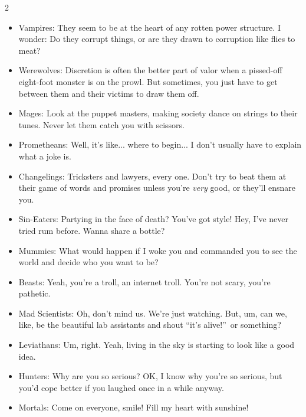 \begin{multicols}{2}
\begin{itemize}
\item Vampires: They seem to be at the heart of any rotten power structure. I wonder: Do they corrupt things, or are they drawn to corruption like flies to meat?
\item Werewolves: Discretion is often the better part of valor when a pissed-off eight-foot monster is on the prowl. But sometimes, you just have to get between them and their victims to draw them off.
\item Mages: Look at the puppet masters, making society dance on strings to their tunes. Never let them catch you with scissors.
\item Prometheans: Well, it's like... where to begin... I don't usually have to explain what a joke is.
\item Changelings: Tricksters and lawyers, every one. Don’t try to beat them at their game of words and promises unless you’re \textit{very} good, or they’ll ensnare you.
\item Sin-Eaters: Partying in the face of death? You've got style! Hey, I've never tried rum before. Wanna share a bottle?
\item Mummies: What would happen if I woke you and commanded you to see the world and decide who you want to be? 
\item Beasts: Yeah, you're a troll, an internet troll. You're not scary, you're pathetic.
\item Mad Scientists: Oh, don't mind us. We're just watching. But, um, can we, like, be the beautiful lab assistants and shout \textquotedblleft it's alive!\textquotedblright\, or something?
\item Leviathans: Um, right. Yeah, living in the sky is starting to look like a good idea.
\item Hunters: Why are you so serious? OK, I know why you're so serious, but you'd cope better if you laughed once in a while anyway.
\item Mortals: Come on everyone, smile! Fill my heart with sunshine!

\end{itemize}


\end{multicols}
